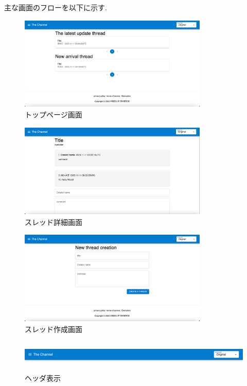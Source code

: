 \documentclass[b5paper,12pt,dvipdfmx]{jsreport}
\begin{document}
主な画面のフローを以下に示す.

\begin{figure}[htbp]
	\centering
	\includegraphics[width=90mm,height=45mm]{img/home.png}

	\caption*{トップページ画面}
\end{figure}
\begin{figure}[htbp]
	\centering
	\includegraphics[width=90mm,height=45mm]{img/thread.png}

	\caption*{スレッド詳細画面}
\end{figure}

\begin{figure}[htbp]
	\centering
	\includegraphics[width=90mm,height=45mm]{img/thread_create.png}

	\caption*{スレッド作成画面}
\end{figure}

\begin{figure}[htbp]
	\centering
	\includegraphics[width=190mm,height=15mm]{img/header.png}

	\caption*{ヘッダ表示}
\end{figure}
\end{document}
